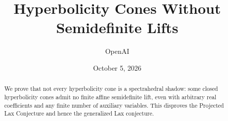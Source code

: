 \documentclass[11pt]{article}
\title{Hyperbolicity Cones Without Semidefinite Lifts}
\author{OpenAI}
\date{October 5, 2026}
\theoremstyle{definition}
\theoremstyle{remark}
\numberwithin{equation}{section}
\begin{document}
\maketitle
\begin{abstract}
We prove that not every hyperbolicity cone is a spectrahedral shadow:
some closed hyperbolicity cones admit no finite affine semidefinite lift,
even with arbitrary real coefficients and any finite number of auxiliary
variables. This disproves the Projected Lax Conjecture and hence the
generalized Lax conjecture.
\end{abstract}





\appendix



\end{document}

